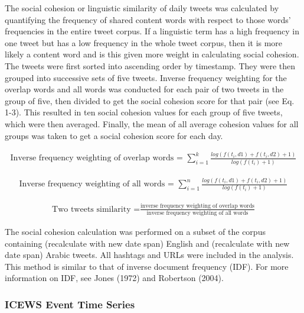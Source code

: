 \documentclass[english,man]{apa6}
\begin{document}
The social cohesion or linguistic similarity of daily tweets was calculated by quantifying the frequency of shared content words with respect to those words' frequencies in the entire tweet corpus. If a linguistic term has a high frequency in one tweet but has a low frequency in the whole tweet corpus, then it is more likely a content word and is this given more weight in calculating social cohesion.
The tweets were first sorted into ascending order by timestamp. They were then grouped into successive sets of five tweets. Inverse frequency weighting for the overlap words and all words was conducted for each pair of two tweets in the group of five, then divided to get the social cohesion score for that pair (see Eq. 1-3). This resulted in ten social cohesion values for each group of five tweets, which were then averaged. Finally, the mean of all average cohesion values for all groups was taken to get a social cohesion score for each day.

\begin{align}
\text{Inverse frequency weighting of overlap words = }\sum_{i=1}^k \frac{log(f(t_i, d1) + f(t_i, d2) + 1)}{log(f(t_i) + 1)}
\end{align}

\begin{align}
\text{Inverse frequency weighting of all words = }\sum_{i=1}^n \frac{log(f(t_i, d1) + f(t_i, d2) + 1)}{log(f(t_i) + 1)}
\end{align}

\begin{align}
\text{Two tweets similarity =}\frac{\text{inverse frequency weighting of overlap words}}{\text{inverse frequency weighting of all words}}
\end{align}

The social cohesion calculation was performed on a subset of the corpus containing (recalculate with new date span) English and (recalculate with new date span) Arabic tweets. All hashtags and URLs were included in the analysis. This method is similar to that of inverse document frequency (IDF). For more information on IDF, see Jones (1972) and Robertson (2004).

\hypertarget{icews-event-time-series}{%
\subsubsection{ICEWS Event Time Series}\label{icews-event-time-series}}
\end{document}

